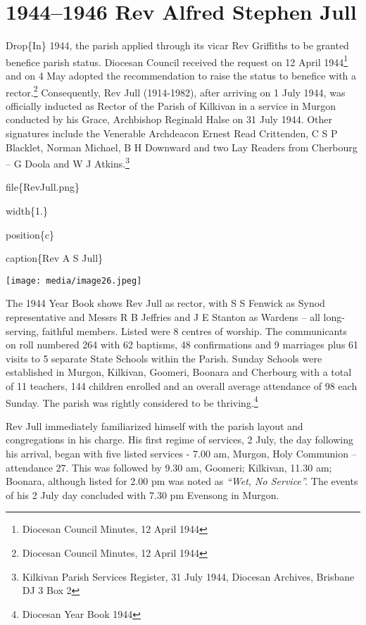 \hypertarget{rev-alfred-stephen-jull}{%
\chapter{1944--1946 Rev Alfred Stephen Jull}\label{rev-alfred-stephen-jull}}

Drop\{In\} 1944, the parish applied through its vicar Rev Griffiths to be granted benefice parish status. Diocesan Council received the request on 12 April 1944\footnote{Diocesan Council Minutes, 12 April 1944} and on 4 May adopted the recommendation to raise the status to benefice with a rector.\footnote{Diocesan Council Minutes, 12 April 1944} Consequently, Rev Jull (1914-1982), after arriving on 1 July 1944, was officially inducted as Rector of the Parish of Kilkivan in a service in Murgon conducted by his Grace, Archbishop Reginald Halse on 31 July 1944. Other signatures include the Venerable Archdeacon Ernest Read Crittenden, C S P Blacklet, Norman Michael, B H Downward and two Lay Readers from Cherbourg -- G Doola and W J Atkins.\footnote{Kilkivan Parish Services Register, 31 July 1944, Diocesan Archives, Brisbane DJ 3 Box 2}

file\{RevJull.png\}

width\{1.\}

position\{c\}

caption\{Rev A S Jull\}

\texttt{[image: media/image26.jpeg]}

The 1944 Year Book shows Rev Jull as rector, with S S Fenwick as Synod representative and Messrs R B Jeffries and J E Stanton as Wardens -- all long-serving, faithful members. Listed were 8 centres of worship. The communicants on roll numbered 264 with 62 baptisms, 48 confirmations and 9 marriages plus 61 visits to 5 separate State Schools within the Parish. Sunday Schools were established in Murgon, Kilkivan, Goomeri, Boonara and Cherbourg with a total of 11 teachers, 144 children enrolled and an overall average attendance of 98 each Sunday. The parish was rightly considered to be thriving.\footnote{Diocesan Year Book 1944}

Rev Jull immediately familiarized himself with the parish layout and congregations in his charge. His first regime of services, 2 July, the day following his arrival, began with five listed services - 7.00 am, Murgon, Holy Communion -- attendance 27. This was followed by 9.30 am, Goomeri; Kilkivan, 11.30 am; Boonara, although listed for 2.00 pm was noted as \emph{``Wet, No Service''.} The events of his 2 July day concluded with 7.30 pm Evensong in Murgon.

